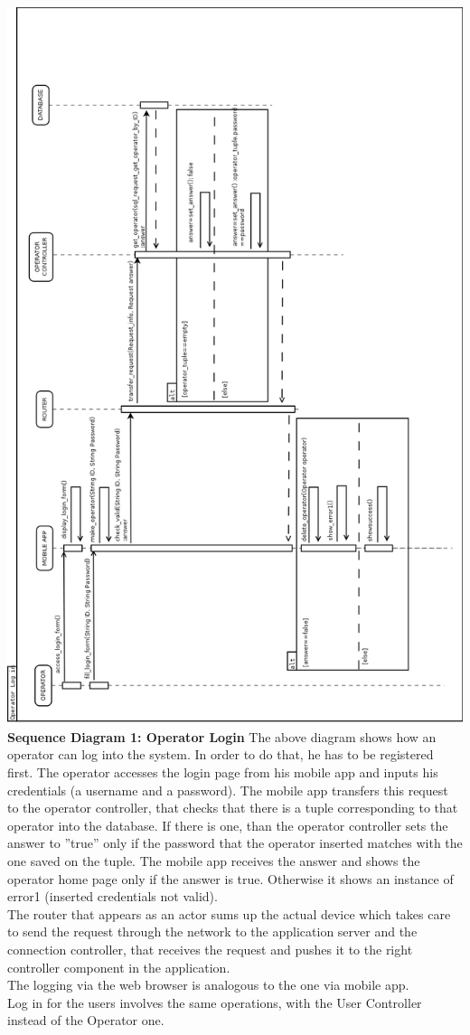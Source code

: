 \documentclass{article}
\begin{document}
\begin{flushleft}
\includegraphics[scale=0.4]{seq1_login} 
\newpage
\textbf{Sequence Diagram 1: Operator Login}
\break
The above diagram shows how an operator can log into the system. In order to do that, he has to be registered first. The operator accesses the login page from his mobile app and inputs his credentials (a username and a password). The mobile app transfers this request to the operator controller, that checks that there is a tuple corresponding to that operator into the database. If there is one, than the operator controller sets the answer to ''true'' only if the password that the operator inserted matches with the one saved on the tuple. The mobile app receives the answer and shows the operator home page only if the answer is true. Otherwise it shows an instance of error1 (inserted credentials not valid). \\
The router that appears as an actor sums up the actual device which takes care to send the request through the network to the application server and the connection controller, that receives the request and pushes it to the right controller component in the application.\\
The logging via the web browser is analogous to the one via mobile app.\\
Log in for the users involves the same operations, with the User Controller instead of the Operator one.




\end{flushleft}
\end{document}
